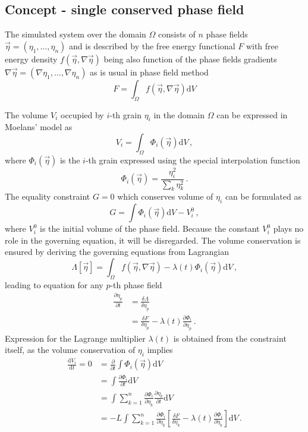 \subsection{Concept - single conserved phase field}
The simulated system over the domain $\Omega$ consists of $n$ phase fields $\vec{\eta}=(\eta_1,\dots,\eta_n)$ and is described by the free energy functional $F$ with free energy density $f(\vec{\eta},\nabla\vec{\eta})$ being also function of the phase fields gradients $\nabla\vec{\eta}=(\nabla\eta_1,\dots,\nabla\eta_n)$ as is usual in phase field method
\begin{equation}
	F= \int_\Omega f(\vec{\eta},\nabla\vec{\eta}) \mathrm{d}V    
\end{equation}

The volume $V_i$ occupied by $i$-th grain $\eta_i$ in the domain $\Omega$ can be expressed in Moelans' model as
\begin{equation}
	V_i = \int_\Omega \Phi_i(\vec{\eta}) \mathrm{d}V \,,
\end{equation}
where $\Phi_i(\vec{\eta})$ is the $i$-th grain expressed using the special interpolation function~\cite{Moelans2011}
\begin{equation}
	\Phi_i(\vec{\eta}) = \frac{\eta_i^2}{\sum_k\eta_k^2} \,.
\end{equation}
The equality constraint $G=0$ which conserves volume of $\eta_i$ can be formulated as
\begin{equation}
	G = \int \Phi_i(\vec{\eta}) \mathrm{d}V - V_i^0 \,,
\end{equation}
where $V_i^0$ is the initial volume of the phase field. Because the constant $V_i^0$ plays no role in the governing equation, it will be disregarded. The volume conservation is ensured by deriving the governing equations from Lagrangian 
\begin{equation}
	\Lambda[\vec{\eta}]= \int_\Omega f(\vec{\eta},\nabla\vec{\eta}) - \lambda(t)\Phi_i(\vec{\eta}) \mathrm{d}V \,,
\end{equation}
leading to equation for any $p$-th phase field
\begin{align}
	\frac{\partial \eta_p}{\partial t} &= \frac{\delta \Lambda}{\delta \eta_p} \\
	&= \frac{\delta F}{\delta \eta_p} - \lambda(t)\frac{\partial \Phi_i}{\partial \eta_p}\,.
\end{align}
Expression for the Lagrange multiplier $\lambda(t)$ is obtained from the constraint itself, as the volume conservation of $\eta_i$ implies
\begin{align}
	\frac{\mathrm{d} V_i}{\mathrm{d} t} = 0 &= \frac{\partial}{\partial t}\int \Phi_i(\vec{\eta}) \mathrm{d}V \label{eq_PFVC_Lagrm_vol_invarcond}\\
	&= \int \frac{\partial \Phi_i}{\partial t} \mathrm{d}V \\
	&= \int \sum_{k=1}^n\frac{\partial \Phi_i}{\partial \eta_k}\frac{\partial \eta_k}{\partial t} \mathrm{d}V \\
	&= -L\int \sum_{k=1}^n\frac{\partial \Phi_i}{\partial \eta_k}\left[ \frac{\delta F}{\delta \eta_k} - \lambda(t)\frac{\partial \Phi_i}{\partial \eta_k} \right] \mathrm{d}V \,.
\end{align}
